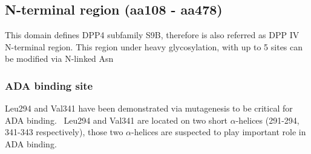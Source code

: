 \subsection{N-terminal region (aa108 - aa478)}

This domain defines DPP4 subfamily S9B, therefore is also referred as DPP IV N-terminal region. This region under heavy glycosylation, with up to 5 sites can be modified via N-linked Asn   

\subsubsection{ADA binding site}
Leu294 and Val341 have been demonstrated via mutagenesis to be critical for ADA binding.~\cite{Abbott_1999} Leu294 and Val341 are located on two short $\alpha$-helices (291-294, 341-343 respectively), those two $\alpha$-helices are suspected to play important role in ADA binding. 